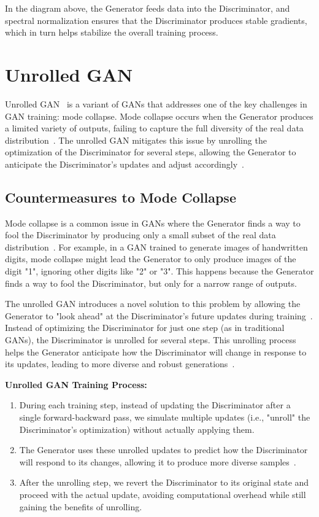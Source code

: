 In the diagram above, the Generator feeds data into the Discriminator, and spectral normalization ensures that the Discriminator produces stable gradients, which in turn helps stabilize the overall training process.

\section{Unrolled GAN}
Unrolled GAN~\cite{metz2016unrolled} is a variant of GANs that addresses one of the key challenges in GAN training: mode collapse. Mode collapse occurs when the Generator produces a limited variety of outputs, failing to capture the full diversity of the real data distribution~\cite{wu2021modeling}. The unrolled GAN mitigates this issue by unrolling the optimization of the Discriminator for several steps, allowing the Generator to anticipate the Discriminator's updates and adjust accordingly~\cite{wang2022unrolled}.

\subsection{Countermeasures to Mode Collapse}
Mode collapse is a common issue in GANs where the Generator finds a way to fool the Discriminator by producing only a small subset of the real data distribution~\cite{chen2024unsupervised}. For example, in a GAN trained to generate images of handwritten digits, mode collapse might lead the Generator to only produce images of the digit "1", ignoring other digits like "2" or "3". This happens because the Generator finds a way to fool the Discriminator, but only for a narrow range of outputs.

The unrolled GAN introduces a novel solution to this problem by allowing the Generator to "look ahead" at the Discriminator's future updates during training~\cite{metz2016unrolled}. Instead of optimizing the Discriminator for just one step (as in traditional GANs), the Discriminator is unrolled for several steps. This unrolling process helps the Generator anticipate how the Discriminator will change in response to its updates, leading to more diverse and robust generations~\cite{wu2021modeling}.

\textbf{Unrolled GAN Training Process:}

\begin{enumerate}
    \item During each training step, instead of updating the Discriminator after a single forward-backward pass, we simulate multiple updates (i.e., "unroll" the Discriminator's optimization) without actually applying them.
    \item The Generator uses these unrolled updates to predict how the Discriminator will respond to its changes, allowing it to produce more diverse samples~\cite{wang2022unrolled}.
    \item After the unrolling step, we revert the Discriminator to its original state and proceed with the actual update, avoiding computational overhead while still gaining the benefits of unrolling.
\end{enumerate}

